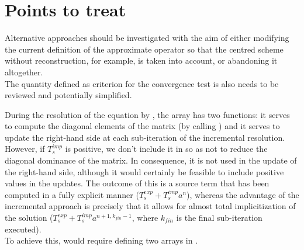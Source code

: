 \section*{Points to treat}\label{Base_Codits_section4}
Alternative approaches should be investigated with the aim of either modifying the current definition
of the approximate operator so that the centred scheme without reconstruction, for example, is
taken into account, or abandoning it altogether.\\

The quantity defined as criterion for the convergence test is also needs to be reviewed and potentially simplified.

During the resolution of the equation by , the  array has
two functions: it serves to compute the diagonal elements of the matrix (by calling
) and it serves to update the right-hand side at each
sub-iteration of the incremental resolution. However, if $T_s^{imp}$ is positive,
we don't include it in  so as not to reduce the diagonal dominance
of the matrix. In consequence, it is not used in the update of the right-hand side,
although it would certainly be feasible to include positive values in the updates.
The outcome of this is a source term that has been computed in a fully explicit
manner ($T_s^{exp}+T_s^{imp}a^n$), whereas the advantage of the incremental
approach is precisely that it allows for almost total implicitization of the solution
($T_s^{exp}+T_s^{imp}a^{n+1,k_{fin}-1}$, where $k_{fin}$ is
the final sub-iteration executed).\\
To achieve this, would require defining two  arrays in .
